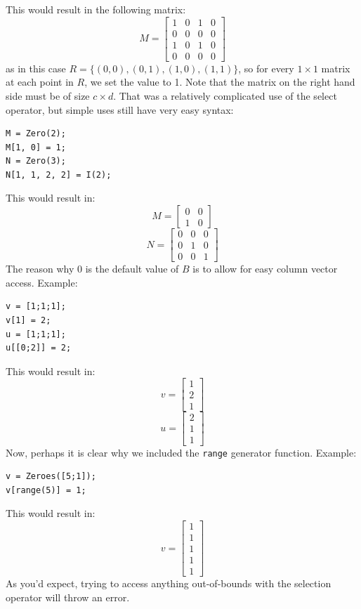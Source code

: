 This would result in the following matrix:
$$M = \begin{bmatrix}
1 & 0 & 1 & 0\\
0 & 0 & 0 & 0\\
1 & 0 & 1 & 0\\
0 & 0 & 0 & 0
\end{bmatrix}$$
as in this case $R=\{(0,0), (0,1), (1,0), (1,1)\}$, so for every $1\times 1$ matrix at each point in $R$, we set the value to 1.  Note that the matrix on the right hand side must be of size $c\times d$.  That was a relatively complicated use of the select operator, but simple uses still have very easy syntax:
\begin{lstlisting}
M = Zero(2);
M[1, 0] = 1;
N = Zero(3);
N[1, 1, 2, 2] = I(2);
\end{lstlisting}
This would result in:
$$M=\begin{bmatrix}0 & 0 \\ 1 & 0\end{bmatrix}$$
$$N=\begin{bmatrix}
0 & 0 & 0\\
0 & 1 & 0\\
0 & 0 & 1\end{bmatrix}$$
The reason why 0 is the default value of  $B$ is to allow for easy column vector access.  Example:
\begin{lstlisting}
v = [1;1;1];
v[1] = 2;
u = [1;1;1];
u[[0;2]] = 2;
\end{lstlisting}
This would result in:
$$v=\begin{bmatrix}1\\2\\1\end{bmatrix}$$
$$u=\begin{bmatrix}2\\1\\1\end{bmatrix}$$
Now, perhaps it is clear why we included the \verb=range= generator function.  Example:
\begin{lstlisting}
v = Zeroes([5;1]);
v[range(5)] = 1;
\end{lstlisting}
This would result in:
$$v=\begin{bmatrix}1\\1\\1\\1\\1\end{bmatrix}$$
As you'd expect, trying to access anything out-of-bounds with the selection operator will throw an error.

